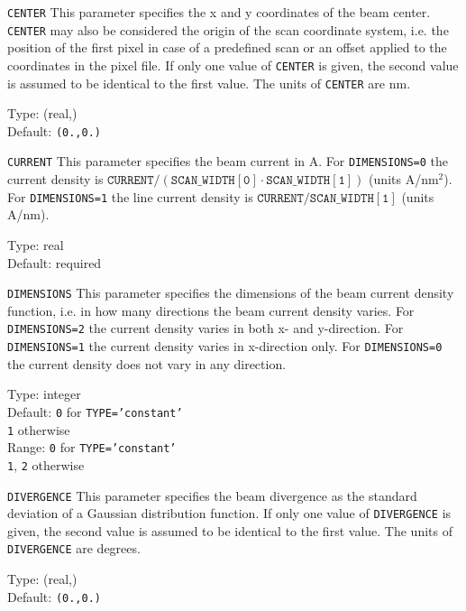 \begin{keydescription}{\texttt{CENTER}}
This parameter specifies the x and y coordinates of the beam center.
\texttt{CENTER} may also be considered the origin of the scan coordinate
system, i.e. the position of the first pixel in case of a predefined scan
or an offset applied to the coordinates in the pixel file. If only one value
of \texttt{CENTER} is given, the second value is assumed to be identical to
the first value. The units  of \texttt{CENTER} are nm.  
\begin{keytab}
   Type:    \> (real,) \\
   Default: \> \texttt{(0.,0.)}
\end{keytab}
\end{keydescription}

\begin{keydescription}{\texttt{CURRENT}}
This parameter specifies the beam current in A. For \texttt{DIMENSIONS=0} the
current density is $\mathtt{CURRENT} / (\mathtt{SCAN\_WIDTH[0]} \cdot
\mathtt{SCAN\_WIDTH[1]})$ (units A/nm$^2$). For \texttt{DIMENSIONS=1} the  line
current density is $\mathtt{CURRENT} / \mathtt{SCAN\_WIDTH[1]}$ (units A/nm). 
\begin{keytab}
   Type:    \> real \\
   Default: \> required
\end{keytab}
\end{keydescription}

\begin{keydescription}{\texttt{DIMENSIONS}}
This parameter specifies the dimensions of the beam current density function,
i.e. in how many directions the beam current density varies. For
\texttt{DIMENSIONS=2} the current density varies in both x- and y-direction. For 
\texttt{DIMENSIONS=1} the current density varies in x-direction only. For 
\texttt{DIMENSIONS=0} the current density does not vary in any direction. 
\begin{keytab}
   Type:    \> integer \\
   Default: \> \texttt{0} for \texttt{TYPE='constant'} \\
            \> \texttt{1} otherwise \\
   Range:   \> \texttt{0} for \texttt{TYPE='constant'} \\
            \> \texttt{1}, \texttt{2} otherwise
\end{keytab}
\end{keydescription}

\begin{keydescription}{\texttt{DIVERGENCE}}
This parameter specifies the beam divergence as the standard deviation of a
Gaussian distribution function. If only one value of \texttt{DIVERGENCE} is
given, the second value is assumed to be identical to the first value. The
units of \texttt{DIVERGENCE} are degrees.
\begin{keytab}
   Type:    \> (real,) \\
   Default: \> \texttt{(0.,0.)} 
\end{keytab}
\end{keydescription}

